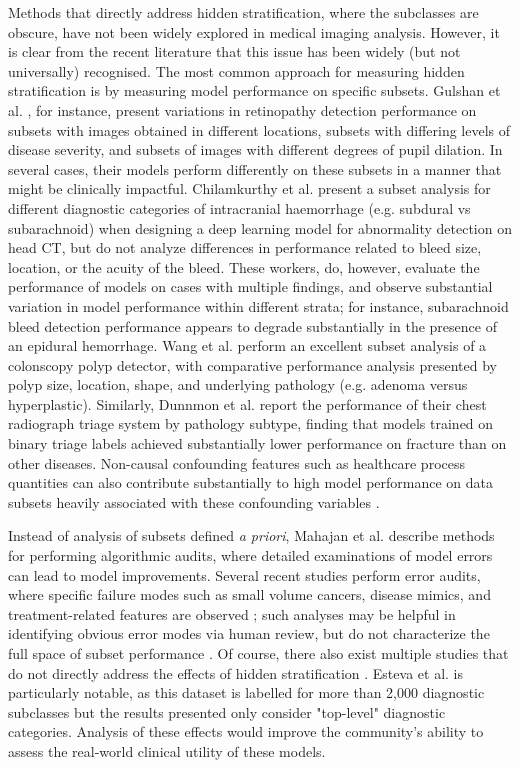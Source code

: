 \documentclass{article}
\begin{document}
Methods that directly address hidden stratification, where the subclasses are obscure, have not been widely explored in medical imaging analysis.  
However, it is clear from the recent literature that this issue has been widely (but not universally) recognised.  
The most common approach for measuring hidden stratification is by measuring model performance on specific subsets.
Gulshan et al. \citep{Gulshan2016-we}, for instance, present variations in retinopathy detection performance on subsets with images obtained in different locations, subsets with differing levels of disease severity, and subsets of images with different degrees of pupil dilation.  
In several cases, their models perform differently on these subsets in a manner that might be clinically impactful.  
Chilamkurthy et al. \citep{Chilamkurthy2018-op}  present a subset analysis for different diagnostic categories of intracranial haemorrhage (e.g. subdural vs subarachnoid) when designing a deep learning model for abnormality detection on head CT, but do not analyze differences in  performance related to bleed size, location, or the acuity of the bleed. 
 These workers, do, however, evaluate the performance of models on cases with multiple findings, and observe substantial variation in model performance within different strata; for instance, subarachnoid bleed detection performance appears to degrade substantially in the presence of an epidural hemorrhage.  
Wang et al. \citep{Wang2019-jr} perform an excellent subset analysis of a colonscopy polyp detector, with comparative performance analysis presented by polyp size, location, shape, and underlying pathology (e.g. adenoma versus hyperplastic).  
 Similarly, Dunnmon et al. \citep{Dunnmon2019-rr} report the performance of their chest radiograph triage system by pathology subtype, finding that models trained on binary triage labels achieved substantially lower performance on fracture than on other diseases.   
Non-causal confounding features such as healthcare process quantities can also contribute substantially to high model performance on data subsets heavily associated with these confounding variables \citep{Winkler2019-fw, Badgeley2019-zi, Agniel2018-qp, Zech2018-xq}.

Instead of analysis of subsets defined \textit{a priori}, Mahajan et al. \citep{Mahajan2019-yi} describe methods for performing algorithmic audits, where detailed examinations of model errors can lead to model improvements.
 Several recent studies perform error audits, where specific failure modes such as small volume cancers, disease mimics, and treatment-related features are observed \citep{Campanella2019-qs, Wang2019-jr}; such analyses may be helpful in identifying obvious error modes via human review, but do not characterize the full space of subset performance \citep{Selbst2017-gz}.  
 Of course, there also exist multiple studies that do not directly address the effects of hidden stratification \citep{Haenssle2018-vw, Bien2018-ae}. 
 Esteva et al. \citep{Esteva2017-if} is particularly notable, as this dataset is labelled for more than 2,000 diagnostic subclasses but the results presented only consider "top-level" diagnostic categories. 
 Analysis of these effects would improve the community's ability to assess the real-world clinical utility of these models. 
 
\end{document}
